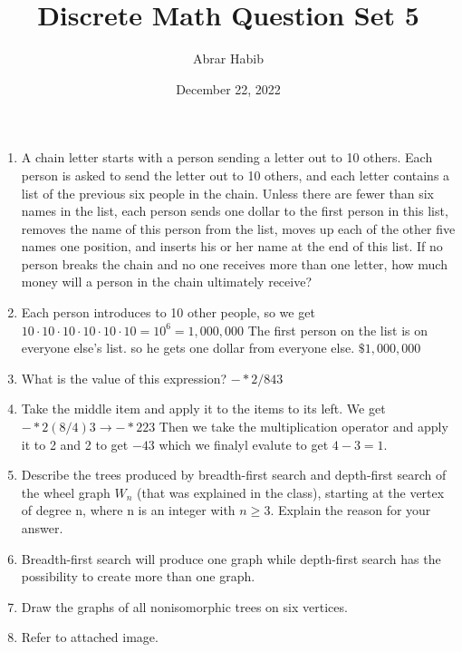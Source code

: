 \documentclass[letterpaper,11pt]{article}
\begin{document}
\title{Discrete Math Question Set 5}
\author{Abrar Habib}
\date{December 22, 2022}
\maketitle

\begin{enumerate}
    \item A chain letter starts with a person sending a letter out to 10 others. Each person is asked to send the letter
    out to 10 others, and each letter contains a list of the previous six people in the chain. Unless there are fewer
    than six names in the list, each person sends one dollar to the first person in this list, removes the name of this
    person from the list, moves up each of the other five names one position, and inserts his or her name at the
    end of this list. If no person breaks the chain and no one receives more than one letter, how much money will
    a person in the chain ultimately receive?
    \item [] Each person introduces to 10 other people, so we get $10\cdot 10\cdot 10\cdot 10\cdot 10\cdot 10 = 10^6 = 1,000,000$ The first person on the list is on everyone else's list. so he gets one dollar from everyone else. $\$ 1,000,000$
    \item What is the value of this expression? $- * 2/843$
    \item [] Take the middle item and apply it to the items to its left. We get $- * 2(8/4) 3 \rightarrow -*2 2 3$ Then we take the multiplication operator and apply it to 2 and 2 to get $-43$ which we finalyl evalute to get $4-3 = 1$.
    \item Describe the trees produced by breadth-first search and depth-first search of the wheel graph $W_n$ (that was
    explained in the class), starting at the vertex of degree n, where n is an integer with $n \geq 3$. Explain the reason
    for your answer.
    \item [] Breadth-first search will produce one graph while depth-first search has the possibility to create more than one graph.
    \newpage
    \item Draw the graphs of all nonisomorphic trees on six vertices.
    \item[] Refer to attached image.

\end{enumerate}
\end{document}
